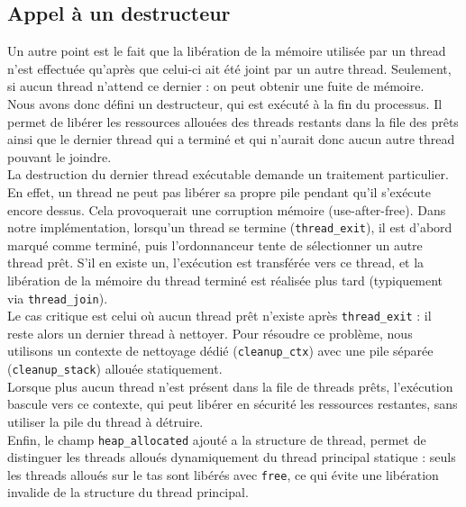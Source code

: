 \subsection{Appel à un destructeur}
Un autre point est le fait que la libération de la mémoire utilisée par un thread n'est effectuée qu'après que celui-ci ait été joint
par un autre thread. Seulement, si aucun thread n'attend ce dernier : on peut obtenir une fuite de mémoire.  \\ 
Nous avons donc défini un destructeur, qui est exécuté à la fin du processus. Il permet de libérer les ressources allouées des threads restants dans la file des prêts ainsi que le dernier thread qui a terminé et qui n'aurait donc aucun autre thread pouvant le joindre. \\
La destruction du dernier thread exécutable demande un traitement particulier.
En effet, un thread ne peut pas libérer sa propre pile pendant qu'il s'exécute encore dessus. Cela provoquerait une corruption mémoire (use-after-free).
Dans notre implémentation, lorsqu'un thread se termine (\texttt{thread\_exit}), il est d'abord marqué comme terminé, puis l'ordonnanceur tente de sélectionner un autre thread prêt.
S'il en existe un, l'exécution est transférée vers ce thread, et la libération de la mémoire du thread terminé est réalisée plus tard (typiquement via \texttt{thread\_join}).\\ 
Le cas critique est celui où aucun thread prêt n'existe après \texttt{thread\_exit} : il reste alors un dernier thread à nettoyer.
Pour résoudre ce problème, nous utilisons un contexte de nettoyage dédié (\texttt{cleanup\_ctx}) avec une
pile séparée (\texttt{cleanup\_stack}) allouée statiquement.\\ 

Lorsque plus aucun thread n'est présent dans la file de threads prêts, l'exécution bascule vers ce contexte, qui peut libérer en sécurité les ressources restantes, sans
utiliser la pile du thread à détruire. \\ 
Enfin, le champ \texttt{heap\_allocated} ajouté a la structure de thread,  permet de distinguer les threads alloués dynamiquement du thread principal statique : seuls les threads alloués sur le tas sont libérés avec \texttt{free}, ce qui évite une libération
  invalide de la structure du thread principal.


